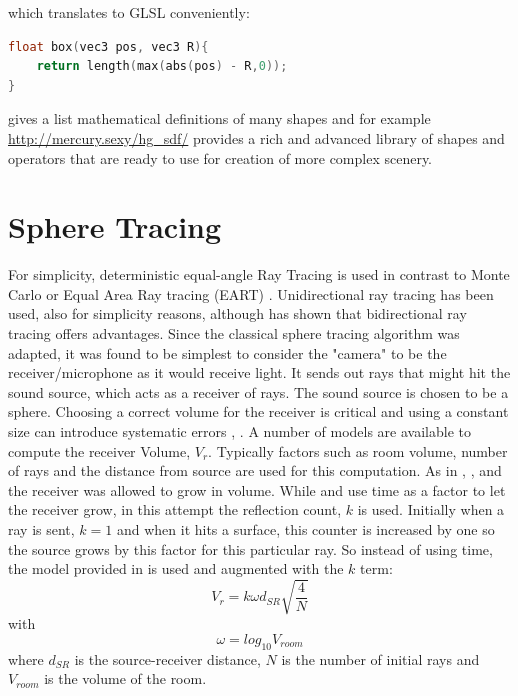 \documentclass[twoside,a4paper]{article}
\begin{document}
which translates to GLSL conveniently:

\begin{lstlisting}[language=C, caption={\it GLSL code for creating a box SDF},captionpos=b, label=lst:boxSdf]
float box(vec3 pos, vec3 R){
    return length(max(abs(pos) - R,0));
}
\end{lstlisting}

\cite{hart_sphere_1996} gives a list mathematical definitions of many shapes and for example \href{http://mercury.sexy/hg_sdf/}{http://mercury.sexy/hg\_sdf/} provides a rich and advanced library of shapes and operators that are ready to use for creation of more complex scenery.


\section{Sphere Tracing}
For simplicity, deterministic equal-angle Ray Tracing is used in contrast to Monte Carlo or Equal Area Ray tracing (EART) \cite{gu_room_2014}. Unidirectional ray tracing has been used, also for simplicity reasons, although \cite{cao_interactive_2016} has shown that bidirectional ray tracing offers advantages. Since the classical sphere tracing algorithm was adapted, it was found to be simplest to consider the "camera" to be the receiver/microphone as it would receive light. It sends out rays that might hit the sound source, which acts as a receiver of rays. The sound source is chosen to be a sphere. Choosing a correct volume for the receiver is critical and using a constant size can introduce systematic errors \cite{xiangyang_accuracy_2003}, \cite{alpkocak_computing_2010}. A number of models are available to compute the receiver Volume, $V_r$. Typically factors such as room volume, number of rays and the distance from source are used for this computation. 
As in \cite{brandao_ray_nodate}, \cite{alpkocak_computing_2010}, and \cite{dalenback_room_1996} the receiver was allowed to grow in volume. While \cite{brandao_ray_nodate} and \cite{dalenback_room_1996} use time as a factor to let the receiver grow, in this attempt the reflection count, $k$ is used. Initially when a ray is sent, $k=1$ and when it hits a surface, this counter is increased by one so the source grows by this factor for this particular ray. So instead of using time, the model provided in \cite{alpkocak_computing_2010} is used and augmented with the $k$ term:
\begin{equation}
V_r = k \omega d_{SR}\sqrt{\frac{4}{N}}
\end{equation}
with 
\begin{equation}
\omega = log_{10}{V_{room}}
\end{equation}
where $d_{SR}$ is the source-receiver distance, $N$ is the number of initial rays and $V_{room}$ is the volume of the room.\
\end{document}
